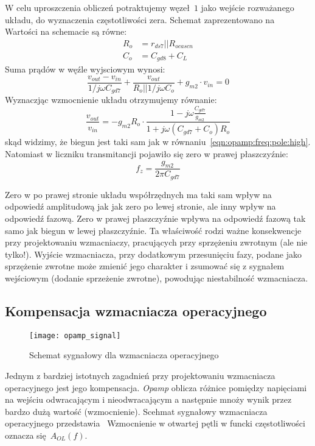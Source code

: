 \documentclass[twoside,pl,final]{labman}
\begin{document}
W celu uproszczenia obliczeń potraktujemy węzeł~$1$ jako wejście rozważanego układu, do wyznaczenia częstotliwości zera.
Schemat zaprezentowano na~
Wartości na schemacie są równe:
\begin{align}
  R_o &= r_{ds7} || R_{ocascn} \\
  C_o &= C_{gd8} + C_L
\end{align}
Suma prądów w węźle wyjsciowym wynosi:
\begin{equation}
  \frac{v_{out} - v_{in}}{1 / j \omega C_{gd7}} + \frac{v_{out}}{R_o || 1 / j \omega C_o} + g_{m2} \cdot v_{in} = 0
\end{equation}
Wyznaczjąc wzmocnienie układu otrzymujemy równanie:
\begin{equation}
  \frac{v_{out}}{v_{in}} = -g_{m2} R_o \cdot \frac{1 - j \omega \frac{C_{gd7}}{g_{m2}}}{1 + j \omega ( C_{gd7} + C_o ) R_o}
\end{equation}
skąd widzimy, że biegun jest taki sam jak w równaniu~\ref{eqn:opamp:freq:pole:high}.
Natomiast w liczniku transmitancji pojawiło się zero w prawej płaszczyźnie:
\begin{equation}
  f_z = \frac{g_{m2}}{2 \pi C_{gd7}}
\end{equation}

Zero w po prawej stronie układu współrzędnych ma taki sam wpływ na odpowiedź amplitudową jak jak zero po lewej stronie,
ale inny wpływ na odpowiedź fazową.
Zero w prawej płaszczyźnie wpływa na odpowiedź fazową tak samo jak biegun w lewej płaszczyźnie.
Ta właściwość rodzi ważne konsekwencje przy projektowaniu wzmacniaczy,
pracujących przy sprzężeniu zwrotnym (ale nie tylko!).
Wyjście wzmacniacza, przy dodatkowym przesunięciu fazy,
podane jako sprzężenie zwrotne może zmienić jego charakter i zsumować się z sygnałem wejściowym
(dodanie sprzeżenie zwrotne), powodując niestabilność wzmacniacza.

\subsection{Kompensacja wzmacniacza operacyjnego}
\label{opamp:schematic:compensation}
\begin{figure}[!htbp]
  \centering
  \texttt{[image: opamp\_signal]}
  \caption{Schemat sygnałowy dla wzmacniacza operacyjnego}
  \label{fig:opamp:schematic:compensation:signal}
\end{figure}

Jednym z bardziej istotnych zagadnień przy projektowaniu wzmacniacza operacyjnego jest jego kompensacja.
\emph{Opamp} oblicza różnice pomiędzy napięciami na wejściu odwracającym i nieodwracającym
a następnie mnoży wynik przez bardzo dużą wartość (wzmocnienie).
Scehmat sygnałowy wzmacniacza operacyjnego przedstawia~
Wzmocnienie w otwartej pętli w funcki częstotliwości oznacza się~$A_{OL}(f)$.
\end{document}
